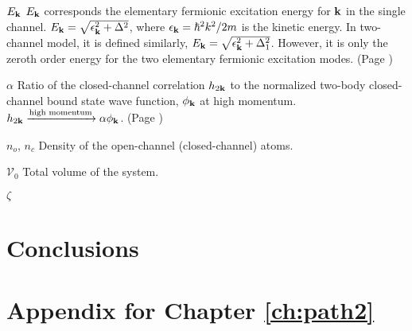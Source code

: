\documentclass[edeposit,fullpage,prequest,10pt]{uiucthesis2009}
\begin{document}
\begin{symbollist}[0.7in]
\item[$E_{\mathbf{k}}$] $E_{\mathbf{k}}$ corresponds the elementary fermionic excitation energy for $\mathbf{k}$ in the single channel.  $E_{\mathbf{k}}=\sqrt{\epsilon_{\mathbf{k}}^{2}+\Delta^{2}}$, where $\epsilon_{\mathbf{k}}=\hbar^{2}k^{2}/2m$ is the kinetic energy. In two-channel model, it is defined similarly, $E_{\mathbf{k}}=\sqrt{\epsilon_{\mathbf{k}}^{2}+\Delta_{1}^{2}}$. However, it is only the zeroth order   energy for the two elementary fermionic excitation modes. (Page \pageref{eq:pathInt:G0})
\item[$\alpha$]  Ratio of the closed-channel correlation $h_{2\mathbf{k}}$ to the normalized two-body closed-channel bound state wave function, $\phi_{\mathbf{k}}$ at high momentum.  $h_{2\mathbf{k}}\xrightarrow{\text{high momentum}}\alpha\phi_{\mathbf{k}}$. (Page \pageref{eq:pathInt2:hphi})
\item[$n_{o}$, $n_{c}$] Density of the open-channel (closed-channel) atoms. 
\item[$\mathcal{V}_{0}$]  Total volume of the system. 
\item[$\zeta$]
\end{symbollist}

\mainmatter




\chapter{Conclusions\label{ch:conclusion}}


\appendix

%

\chapter{Appendix for Chapter \ref{ch:path2}}


\backmatter



\end{document}
